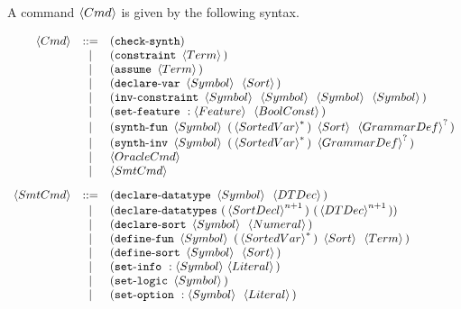 \documentclass[english,a4paper,10pt]{article}
\begin{document}
A command $\left\langle Cmd\right\rangle$ is given by the following syntax.

\[
\begin{array}{rcl}
\cmd 
 & ::= & \paren{\checksynthkwd} \\
 & | & \paren{\constraintkwd\mbox{ }\term} \\
  & | & \paren{\assumekwd\mbox{ }\term} \\
 & | & \paren{\vardeclkwd\mbox{ }\symbol\mbox{ }\sortexpr}\\ 
 & | & \paren{\constraintinvkwd\mbox{ }\symbol\mbox{ }\symbol\mbox{ }\symbol\mbox{ }\symbol} \\
 & | & \paren{\setfeaturekwd\mbox{ }:\feature\mbox{ }\boolconst} \\
 & | & \paren{\synthfunkwd\mbox{ }\symbol\mbox{ }\paren{\kstar{\sortedvar}}\mbox{ }\sortexpr\mbox{ }\koption{\grammardef}}\\
 & | & \paren{\synthinvkwd\mbox{ }\symbol\mbox{ }\paren{\kstar{\sortedvar}}\mbox{ }\koption{\grammardef}} \\
 & | & \oraclecmd \\
 & | & \smtcmd \\[2ex]
\smtcmd 
 & ::= &\paren{\dtdeclkwd\mbox{ }\symbol\mbox{ }\dtdec} \\
 & | & \paren{\dtsdeclkwd\mbox{ }\paren{\kstarn{\sortdecl}{n+1} }\mbox{ }\paren{\kstarn{\dtdec}{n+1}}} \\
 & | & \paren{\sortdeclkwd\mbox{ }\symbol\mbox{ }\intconst} \\
 & | & \paren{\fundefkwd\mbox{ }\symbol\mbox{ }\paren{\kstar{\sortedvar}}\mbox{ }\sortexpr\mbox{ }\term} \\  %
 & | & \paren{\sortdefkwd\mbox{ }\symbol\mbox{ }\sortexpr} \\
 & | & \paren{\setinfokwd\mbox{ }:\symbol{ }\literal} \\
 & | & \paren{\setlogickwd\mbox{ }\symbol} \\
 & | & \paren{\setoptkwd\mbox{ }:\symbol\mbox{ }\literal} \\[2ex]


\end{array}\]
\end{document}
